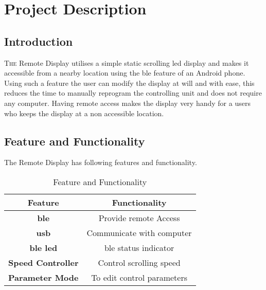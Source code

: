 \vspace*{8.5cm}

\section{Project Description}

\begin{multicols}{2}

		\subsection{Introduction}

			\lettrine{T}{he} Remote Display utilises a simple static scrolling \gls{led} display and makes it accessible from a nearby location using the \gls{ble} feature of an Android phone. Using such a feature the user can modify the display at will and with ease, this reduces the time to manually reprogram the controlling unit and does not require any computer. Having remote access makes the display very handy for a users who keeps the display at a non accessible location. 
			
		\subsection{Feature and Functionality}
		The Remote Display has following  features and functionality.
		\begin{table}[H]
			\caption{Feature and Functionality}
			\begin{tabular}{|c|c|}
				\hline 
				\textbf{Feature} & \textbf{Functionality} \\ 
				\hline 
				\textbf{\gls{ble}} & Provide remote Access \\ 
				\hline 
				\textbf{\acrshort{usb}} & Communicate with computer \\ 
				\hline 
				\textbf{\gls{ble} \gls{led}} & \gls{ble} status indicator \\ 
				\hline 
				\textbf{Speed Controller} & Control scrolling speed \\ 
				\hline 
				\textbf{Parameter Mode} & To edit control parameters \\ 
				\hline 
			\end{tabular} 
		\end{table}	
		

\end{multicols}
